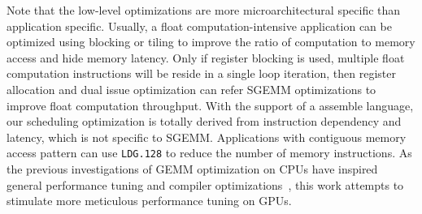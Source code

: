 Note that the low-level optimizations are more microarchitectural specific than application specific. 
Usually, a float computation-intensive application can be optimized using
blocking or tiling to improve the ratio of computation to memory access and hide memory latency. 
Only if register blocking is used, multiple float computation instructions will be reside in a single loop iteration, then register allocation and dual issue optimization can refer SGEMM optimizations to improve float computation throughput. 
With the support of a assemble language, our scheduling optimization is totally derived from instruction dependency and latency, which is not specific to SGEMM. 
Applications with contiguous memory access pattern can use {\tt LDG.128} to reduce the number of memory instructions.
As the previous investigations of GEMM optimization on CPUs have inspired
general performance tuning and compiler optimizations~\cite{lam1991cache}, this work attempts to stimulate more meticulous performance tuning on GPUs.  

